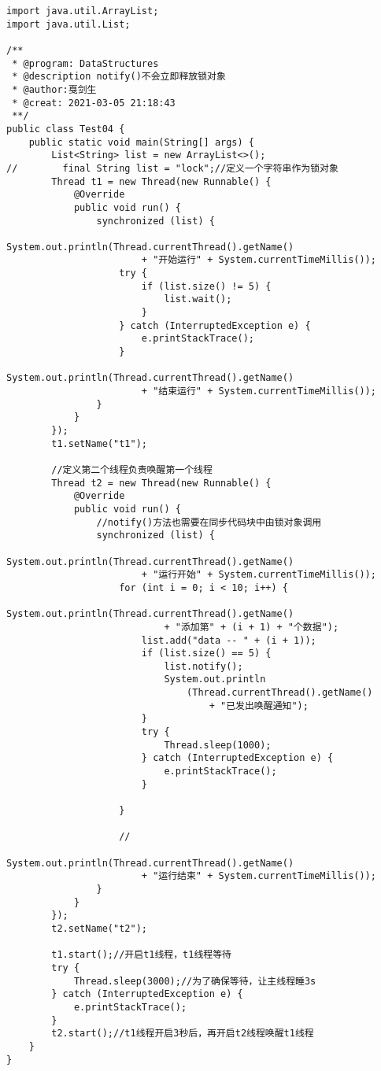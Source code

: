 \documentclass[a4paper]{report}
\begin{document}
\begin{Verbatim}[frame=single,numbersep=5pt,xleftmargin=1.5em,xrightmargin=1.5em]
import java.util.ArrayList;
import java.util.List;

/**
 * @program: DataStructures
 * @description notify()不会立即释放锁对象
 * @author:戛剑生
 * @creat: 2021-03-05 21:18:43
 **/
public class Test04 {
    public static void main(String[] args) {
        List<String> list = new ArrayList<>();
//        final String list = "lock";//定义一个字符串作为锁对象
        Thread t1 = new Thread(new Runnable() {
            @Override
            public void run() {
                synchronized (list) {
                    System.out.println(Thread.currentThread().getName() 
                        + "开始运行" + System.currentTimeMillis());
                    try {
                        if (list.size() != 5) {
                            list.wait();
                        }
                    } catch (InterruptedException e) {
                        e.printStackTrace();
                    }
                    System.out.println(Thread.currentThread().getName() 
                        + "结束运行" + System.currentTimeMillis());
                }
            }
        });
        t1.setName("t1");

        //定义第二个线程负责唤醒第一个线程
        Thread t2 = new Thread(new Runnable() {
            @Override
            public void run() {
                //notify()方法也需要在同步代码块中由锁对象调用
                synchronized (list) {
                    System.out.println(Thread.currentThread().getName() 
                        + "运行开始" + System.currentTimeMillis());
                    for (int i = 0; i < 10; i++) {
                        System.out.println(Thread.currentThread().getName() 
                            + "添加第" + (i + 1) + "个数据");
                        list.add("data -- " + (i + 1));
                        if (list.size() == 5) {
                            list.notify();
                            System.out.println
                                (Thread.currentThread().getName() 
                                    + "已发出唤醒通知");
                        }
                        try {
                            Thread.sleep(1000);
                        } catch (InterruptedException e) {
                            e.printStackTrace();
                        }

                    }

                    //
                    System.out.println(Thread.currentThread().getName() 
                        + "运行结束" + System.currentTimeMillis());
                }
            }
        });
        t2.setName("t2");

        t1.start();//开启t1线程，t1线程等待
        try {
            Thread.sleep(3000);//为了确保等待，让主线程睡3s
        } catch (InterruptedException e) {
            e.printStackTrace();
        }
        t2.start();//t1线程开启3秒后，再开启t2线程唤醒t1线程
    }
}
\end{Verbatim}
\end{document}
